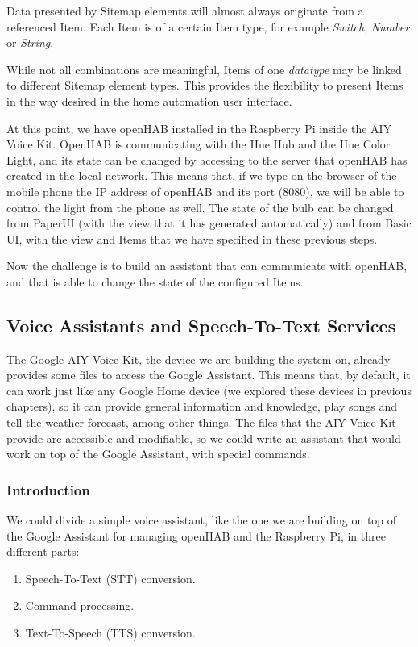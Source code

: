 Data presented by Sitemap elements will almost always originate from a referenced Item. Each Item is of a certain Item type, for
example \textit{Switch}, \textit{Number} or \textit{String}.

While not all combinations are meaningful, Items of one \textit{datatype} may be linked to different Sitemap element types. This
provides the flexibility to present Items in the way desired in the home automation user interface.

\bigskip
At this point, we have openHAB installed in the Raspberry Pi inside the AIY Voice Kit. OpenHAB is communicating with the Hue Hub and
the Hue Color Light, and its state can be changed by accessing to the server that openHAB has created in the local network. This means
that, if we type on the browser of the mobile phone the IP address of openHAB and its port (8080), we will be able to control the light
from the phone as well. The state of the bulb can be changed from PaperUI (with the view that it has generated automatically) and from
Basic UI, with the view and Items that we have specified in these previous steps.

Now the challenge is to build an assistant that can communicate with openHAB, and that is able to change the state of the configured
Items.

\subsection{Voice Assistants and Speech-To-Text Services}
The Google AIY Voice Kit, the device we are building the system on, already provides some files to access the Google Assistant. This
means that, by default, it can work just like any Google Home device (we explored these devices in previous chapters), so it can
provide general information and knowledge, play songs and tell the weather forecast, among other things. The files that the AIY Voice
Kit provide are accessible and modifiable, so we could write an assistant that would work on top of the Google Assistant, with special
commands.

\subsubsection{Introduction}
We could divide a simple voice assistant, like the one we are building on top of the Google Assistant for managing openHAB and the
Raspberry Pi, in three different parts:
\begin{enumerate}
    \item Speech-To-Text (STT) conversion.
    \item Command processing.
    \item Text-To-Speech (TTS) conversion.
\end{enumerate}

